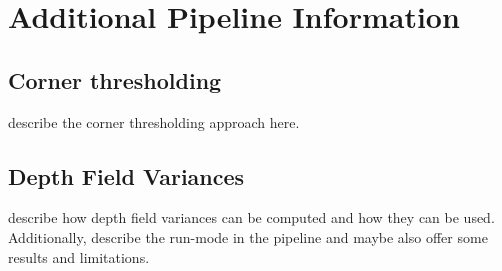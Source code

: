 \chapter{Additional Pipeline Information}
\section{Corner thresholding}
\label{sec:corner_thresholding}
describe the corner thresholding approach here.

\section{Depth Field Variances}
describe how depth field variances can be computed and how they can be used. Additionally, describe the run-mode in the pipeline and maybe also offer some results and limitations.
